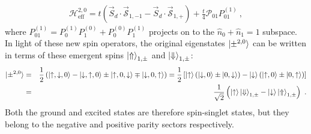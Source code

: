 \documentclass{iopart}
\begin{document}
\begin{eqnarray}
	\mathcal{H}^{2, 0}_\text{eff} = t\left(\vec{S}_d\cdot\vec{\mathcal{S}}_{1,-1} - \vec{S}_d\cdot\vec{\mathcal{S}}_{1,+}\right) + \frac{t}{4}\mathcal{P}_{01} P_{01}^{(1)}~,
\end{eqnarray}
where \(P_{01}^{(1)} = P_{0}^{(1)}P_{1}^{(0)} + P_{0}^{(0)}P_{1}^{(1)}\) projects on to the \(\hat n_0 + \hat n_1 = 1\) subspace. In light of these new spin operators, the original eigenstates \(\ket{\pm^{2,0}}\) can be written in terms of these emergent spins \(\ket{\Uparrow}_{1,\pm}\) and \(\ket{\Downarrow}_{1,\pm}\):
\begin{eqnarray}
	\ket{\pm^{2,0}} &=& \frac{1}{2}\left(\ket{\uparrow,\downarrow,0} - \ket{\downarrow,\uparrow,0} \pm \ket{\uparrow,0,\downarrow} \mp \ket{\downarrow,0,\uparrow}\right) = \frac{1}{2}\left[\ket{\uparrow}\left(\ket{\downarrow,0} \pm \ket{0, \downarrow}\right) - \ket{\downarrow}\left(\ket{\uparrow,0} \pm \ket{0,\uparrow}\right)\right] \nonumber\\
			    &=& \frac{1}{\sqrt 2}\left( \ket{\uparrow}\ket{\Downarrow}_{1,\pm} - \ket{\downarrow}\ket{\Uparrow}_{1,\pm} \right)~.
\end{eqnarray}
Both the ground and excited states are therefore spin-singlet states, but they belong to the negative and positive parity sectors respectively.
\end{document}

